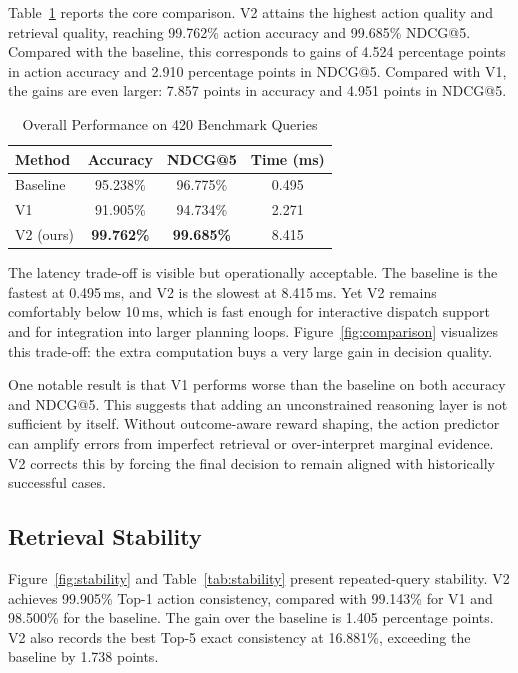 \documentclass[conference]{IEEEtran}
\begin{document}
Table~\ref{tab:main_results} reports the core comparison. V2 attains the highest action quality and retrieval quality, reaching 99.762\% action accuracy and 99.685\% NDCG@5. Compared with the baseline, this corresponds to gains of 4.524 percentage points in action accuracy and 2.910 percentage points in NDCG@5. Compared with V1, the gains are even larger: 7.857 points in accuracy and 4.951 points in NDCG@5.

\begin{table}[t]
\caption{Overall Performance on 420 Benchmark Queries}
\label{tab:main_results}
\centering
\small
\begin{tabular}{lccc}
\toprule
\textbf{Method} & \textbf{Accuracy} & \textbf{NDCG@5} & \textbf{Time (ms)} \\
\midrule
Baseline & 95.238\% & 96.775\% & 0.495 \\
V1 & 91.905\% & 94.734\% & 2.271 \\
V2 (ours) & \textbf{99.762\%} & \textbf{99.685\%} & 8.415 \\
\bottomrule
\end{tabular}
\end{table}

The latency trade-off is visible but operationally acceptable. The baseline is the fastest at 0.495\,ms, and V2 is the slowest at 8.415\,ms. Yet V2 remains comfortably below 10\,ms, which is fast enough for interactive dispatch support and for integration into larger planning loops. Figure~\ref{fig:comparison} visualizes this trade-off: the extra computation buys a very large gain in decision quality.

One notable result is that V1 performs worse than the baseline on both accuracy and NDCG@5. This suggests that adding an unconstrained reasoning layer is not sufficient by itself. Without outcome-aware reward shaping, the action predictor can amplify errors from imperfect retrieval or over-interpret marginal evidence. V2 corrects this by forcing the final decision to remain aligned with historically successful cases.

\subsection{Retrieval Stability}

Figure~\ref{fig:stability} and Table~\ref{tab:stability} present repeated-query stability. V2 achieves 99.905\% Top-1 action consistency, compared with 99.143\% for V1 and 98.500\% for the baseline. The gain over the baseline is 1.405 percentage points. V2 also records the best Top-5 exact consistency at 16.881\%, exceeding the baseline by 1.738 points.
\end{document}
